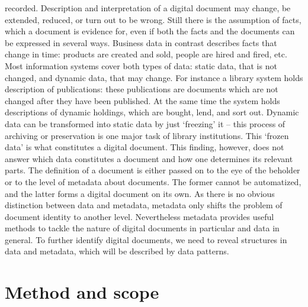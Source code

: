 recorded. Description and interpretation of a digital document may change, be
extended, reduced, or turn out to be wrong. Still there is the assumption of
facts, which a document is evidence for, even if both the facts and the
documents can be expressed in several ways.  Business data in contrast
describes facts that change in time: products are created and sold, people are
hired and fired, etc. Most information systems cover both types of data: static
data, that is not changed, and dynamic data, that may change.  For instance a
library system holds description of publications: these publications are
documents which are not changed after they have been published. At the same
time the system holds descriptions of dynamic holdings, which are bought, lend,
and sort out.  Dynamic data can be transformed into static data by just
`freezing' it -- this process of archiving or preservation is one major task of
library institutions. This `frozen data' is what constitutes a digital
document. This finding, however, does not answer which data constitutes a
document and how one determines its relevant parts. The definition of a
document is either passed on to the eye of the beholder or to the level of
metadata about documents. The former cannot be automatized, and the latter
forms a digital document on its own. As there is no obvious distinction between
data and metadata, metadata only shifts the problem of document identity to
another level. Nevertheless metadata provides useful methods to tackle the
nature of digital documents in particular and data in general. To further
identify digital documents, we need to reveal structures in data and metadata,
which will be described by data patterns.

\pagebreak
\section{Method and scope}
\label{sec:method}

